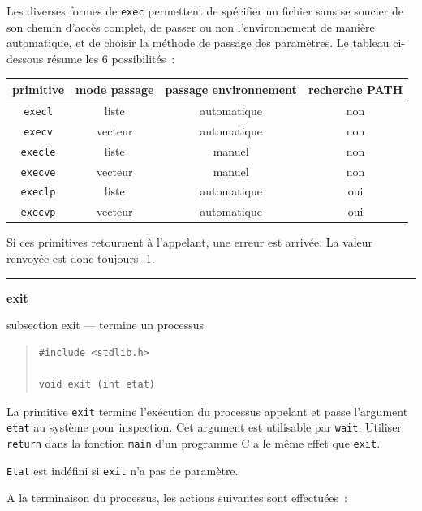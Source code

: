 \documentclass [twoside] {report}
\newcommand {\primitive} [1]
    {
	\phantomsection
	{\large \textbf {#1}}
	\addcontentsline {toc} {subsection} {#1}
    }
\newcommand {\separation}
    {
	\vspace {5mm}
	\nopagebreak
	\hrule
    }
\begin{document}
Les diverses formes de \texttt {exec} permettent de
spécifier un fichier sans se soucier de son chemin
d'accès complet, de passer ou non l'environnement
de manière automatique, et de choisir la méthode
de passage des paramètres. Le tableau ci-dessous
résume les 6 possibilités~:

\begin {center}
    \begin {tabular} {|c|c|c|c|}
	\hline
	\multicolumn {1}{|c|}{primitive} &
	\multicolumn {1}{|c|}{mode passage} &
	\multicolumn {1}{|c|}{passage environnement} &
	\multicolumn {1}{|c|}{recherche PATH} \\
	\hline
	\texttt {execl}		&    liste	& automatique &  non \\
	\texttt {execv}		&  vecteur	& automatique &  non \\
	\texttt {execle}	&    liste	&      manuel &  non \\
	\texttt {execve}	&  vecteur	&      manuel &  non \\
	\texttt {execlp}	&    liste	& automatique &  oui \\
	\texttt {execvp}	&  vecteur	& automatique &  oui \\
	\hline
    \end {tabular}
\end {center}


Si ces primitives retournent à l'appelant, une erreur est
arrivée. La valeur renvoyée est donc toujours -1.




\separation
\primitive {exit} --- termine un processus

\begin {quote}
\begin {verbatim}
#include <stdlib.h>

void exit (int etat)
\end{verbatim}
\end {quote}

La primitive \texttt {exit} termine l'exécution du
processus appelant et passe l'argument \texttt {etat} au
système pour inspection. Cet argument est
utilisable par \texttt {wait}. Utiliser \texttt {return} dans la
fonction \texttt {main} d'un programme C a le même effet
que \texttt {exit}.

\texttt {Etat} est indéfini si \texttt {exit} n'a pas de
paramètre.

A la terminaison du processus, les actions
suivantes sont effectuées~:
\end{document}
